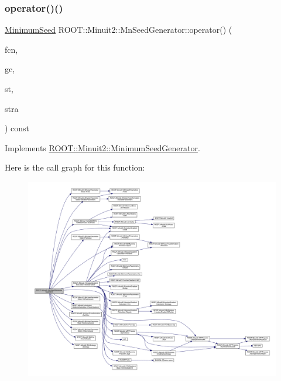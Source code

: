 \subsubsection{\texorpdfstring{operator()()}{operator()()}\hspace{0.1cm}{\footnotesize\ttfamily [4/4]}}
{\footnotesize\ttfamily \mbox{\hyperlink{classROOT_1_1Minuit2_1_1MinimumSeed}{Minimum\+Seed}} R\+O\+O\+T\+::\+Minuit2\+::\+Mn\+Seed\+Generator\+::operator() (\begin{DoxyParamCaption}\item[{const \mbox{\hyperlink{classROOT_1_1Minuit2_1_1MnFcn}{Mn\+Fcn}} \&}]{fcn,  }\item[{const \mbox{\hyperlink{classROOT_1_1Minuit2_1_1AnalyticalGradientCalculator}{Analytical\+Gradient\+Calculator}} \&}]{gc,  }\item[{const \mbox{\hyperlink{classROOT_1_1Minuit2_1_1MnUserParameterState}{Mn\+User\+Parameter\+State}} \&}]{st,  }\item[{const \mbox{\hyperlink{classROOT_1_1Minuit2_1_1MnStrategy}{Mn\+Strategy}} \&}]{stra }\end{DoxyParamCaption}) const\hspace{0.3cm}{\ttfamily [virtual]}}



Implements \mbox{\hyperlink{classROOT_1_1Minuit2_1_1MinimumSeedGenerator_a670b9671c73d7e0d3caa148e82d4b2fa}{R\+O\+O\+T\+::\+Minuit2\+::\+Minimum\+Seed\+Generator}}.

Here is the call graph for this function\+:\nopagebreak
\begin{figure}[H]
\begin{center}
\leavevmode
\includegraphics[width=350pt]{de/da5/classROOT_1_1Minuit2_1_1MnSeedGenerator_a300ecb8a37b30fc5bd13c353f3338a92_cgraph}
\end{center}
\end{figure}


